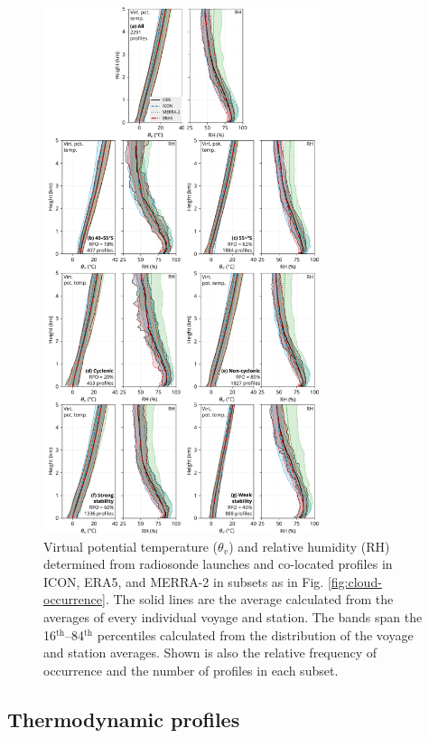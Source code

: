 \documentclass[12pt,a4paper]{article}
\begin{document}
\begin{figure}[p!]
\centering
\includegraphics[width=0.72\textwidth]{img/theta_hur.pdf}
\caption{
Virtual potential temperature ($\theta_v$) and relative humidity (RH)
determined from radiosonde launches and co-located profiles in ICON, ERA5, and
MERRA-2 in subsets as in Fig. \ref{fig:cloud-occurrence}.  The solid lines are
the average calculated from the averages of every individual voyage and
station. The bands span the 16$^\mathrm{th}$--84$^\mathrm{th}$ percentiles
calculated from the distribution of the voyage and station averages. Shown is
also the relative frequency of occurrence and the number of profiles in each
subset.
}
\label{fig:potential-temperature}
\end{figure}

\subsection{Thermodynamic profiles}
\end{document}
